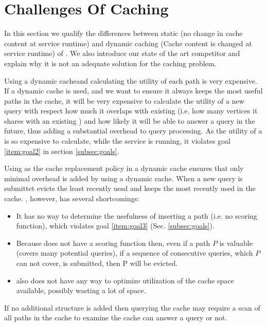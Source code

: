 \section{Challenges Of \spath Caching}\label{sec:competitors}

In this section we qualify the differences between static (no change in cache content at service runtime) and dynamic caching (Cache content is changed at service runtime) of \spathsns. We also introduce our state of the art competitor and explain why it is not an adequate solution for the \spath caching problem.


Using a dynamic cache\footnotemark and calculating the utility of each path is very expensive. If a dynamic cache is used, and we want to ensure it always keeps the most useful paths in the cache, it will be very expensive to calculate the utility of a new query with respect how much it overlaps with existing \spaths (i.e. how many vertices it shares with an existing \spathns) and how likely it will be able to answer a query in the future, thus adding a substantial overhead to query processing. As the utility of a \spath is so expensive to calculate, while the \spath service is running, it violates goal \ref{item:goal2} in section \ref{subsec:goals}.

Using \lru as the cache replacement policy in a dynamic cache ensures that only minimal overhead is added by using a dynamic cache. When a new query is submittet \lru evicts the least recently uesd \spath and keeps the most recently used \spaths in the cache.
\lru, however, has several shortcomings: 
\begin{itemize}
\item It has no way to determine the usefulness of inserting a path (i.e. no scoring function), which violates goal \ref{item:goal3} (Sec. \ref{subsec:goals}). 
\item Because \lru does not have a scoring function then, even if a path $P$ is valuable (covers many potential queries), if a sequence of consecutive queries, which $P$ can not cover, is submitted, then P will be evicted. 
\item \lru also does not have any way to optimize utilization of the cache space available, possibly wasting a lot of space. 
\end{itemize}

If no additional structure is added then querying the cache may require a scan of all paths in the cache to examine the cache can answer a query or not.






